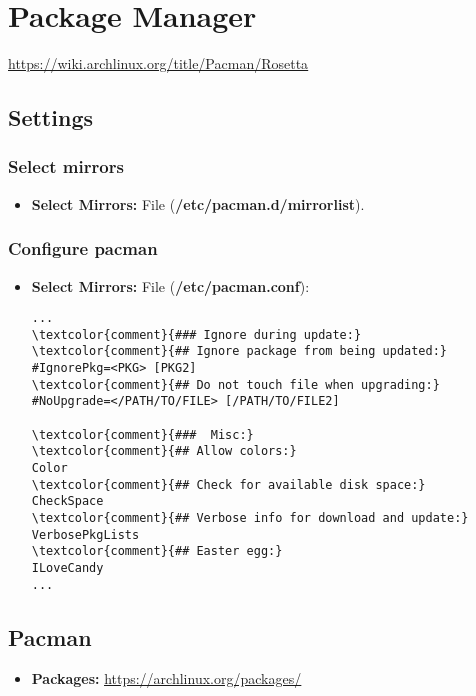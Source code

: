 \documentclass[10pt, a4paper, onecolumn, openany]{book} %
\begin{document}
\chapter{Package Manager}
\underline{\href{https://wiki.archlinux.org/title/Pacman/Rosetta}{https://wiki.archlinux.org/title/Pacman/Rosetta}}
\section{Settings}
\subsection{Select mirrors}
\begin{itemize}
    \item \textbf{Select Mirrors:}
\newline File (\textbf{\textcolor{file}{/etc/pacman.d/mirrorlist}}).
\end{itemize}
\subsection{Configure pacman}
\begin{itemize}
    \item \textbf{Select Mirrors:}
\newline File (\textbf{\textcolor{file}{/etc/pacman.conf}}):
\begin{Verbatim}[commandchars=\\\{\}]
...
\textcolor{comment}{### Ignore during update:}
\textcolor{comment}{## Ignore package from being updated:}
#IgnorePkg=<PKG> [PKG2]
\textcolor{comment}{## Do not touch file when upgrading:}
#NoUpgrade=</PATH/TO/FILE> [/PATH/TO/FILE2]

\textcolor{comment}{###  Misc:}
\textcolor{comment}{## Allow colors:}
Color
\textcolor{comment}{## Check for available disk space:}
CheckSpace
\textcolor{comment}{## Verbose info for download and update:}
VerbosePkgLists
\textcolor{comment}{## Easter egg:}
ILoveCandy
...
\end{Verbatim}
\end{itemize}
\section{Pacman}
\begin{itemize}
    \item \textbf{Packages:}
\newline \underline{\href{https://archlinux.org/packages/}{https://archlinux.org/packages/}}
\end{itemize}
\end{document}
